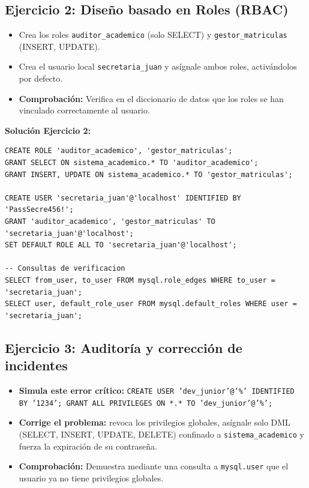 \documentclass[12pt,a4paper]{article}
\begin{document}
\subsection*{Ejercicio 2: Diseño basado en Roles (RBAC)}
\begin{itemize}
    \item Crea los roles \texttt{auditor\_academico} (solo SELECT) y \texttt{gestor\_matriculas} (INSERT, UPDATE).
    \item Crea el usuario local \texttt{secretaria\_juan} y asígnale ambos roles, activándolos por defecto.
    \item \textbf{Comprobación:} Verifica en el diccionario de datos que los roles se han vinculado correctamente al usuario.
\end{itemize}

\textbf{Solución Ejercicio 2:}
\begin{lstlisting}
CREATE ROLE 'auditor_academico', 'gestor_matriculas';
GRANT SELECT ON sistema_academico.* TO 'auditor_academico';
GRANT INSERT, UPDATE ON sistema_academico.* TO 'gestor_matriculas';

CREATE USER 'secretaria_juan'@'localhost' IDENTIFIED BY 'PassSecre456!';
GRANT 'auditor_academico', 'gestor_matriculas' TO 'secretaria_juan'@'localhost';
SET DEFAULT ROLE ALL TO 'secretaria_juan'@'localhost';

-- Consultas de verificacion
SELECT from_user, to_user FROM mysql.role_edges WHERE to_user = 'secretaria_juan';
SELECT user, default_role_user FROM mysql.default_roles WHERE user = 'secretaria_juan';
\end{lstlisting}

\subsection*{Ejercicio 3: Auditoría y corrección de incidentes}
\begin{itemize}
    \item \textbf{Simula este error crítico:} \texttt{CREATE USER 'dev\_junior'@'\%' IDENTIFIED BY '1234'; GRANT ALL PRIVILEGES ON *.* TO 'dev\_junior'@'\%';}
    \item \textbf{Corrige el problema:} revoca los privilegios globales, asígnale solo DML (SELECT, INSERT, UPDATE, DELETE) confinado a \texttt{sistema\_academico} y fuerza la expiración de su contraseña.
    \item \textbf{Comprobación:} Demuestra mediante una consulta a \texttt{mysql.user} que el usuario ya no tiene privilegios globales.
\end{itemize}
\end{document}
